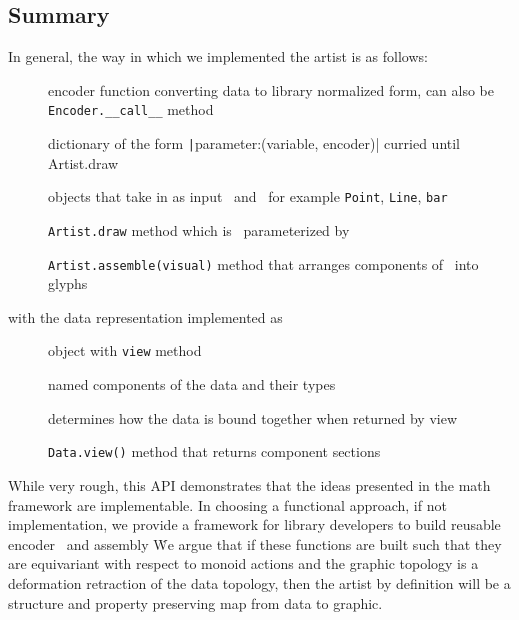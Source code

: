 \documentclass[../main.tex]{subfiles}
\begin{document}
\subsection{Summary}
In general, the way in which we implemented the artist is as follows: 
\begin{description}
    \item[\textbf{\vchannel}] encoder function converting data to library normalized form, can also be \texttt{Encoder.__call__} method
    \item[\textbf{\vsection}]  dictionary of the form \texttt|{parameter:(variable, encoder)}| curried until {Artist.draw}
    \item[\textbf{\vartisteq}] objects that take in as input \dtotal\ and \vtotal\, for example \texttt{Point}, \texttt{Line}, \texttt{bar}
    \item[\textbf{\vartist}] \texttt{Artist.draw} method which is \vartisteq\ parameterized by \vtotal
    \item[\textbf{\vmarkd}] \texttt{Artist.assemble(visual)} method that arranges components of \vtotal\ into glyphs  
\end{description}

with the data representation implemented as 
\begin{description}
    \item[\textbf{\dtotal}] object with \texttt{view} method 
    \item[\textbf{\dfiber}] named components of the data and their types
    \item[\textbf{\dbase}] determines how the data is bound together when returned by view  
    \item[\textbf{\dsection}] \texttt{Data.view()} method that returns component sections
\end{description}    
 
While very rough, this API demonstrates that the ideas presented in the math framework are implementable. In choosing a functional approach, if not implementation, we provide a framework for library developers to build reusable encoder \vchannel\ and assembly \vmarkd\. We argue that  if these functions are built such that they are equivariant with respect to monoid actions and the graphic topology is a deformation retraction of the data topology, then the artist by definition will be a structure and property preserving map from data to graphic. 
\end{document}
